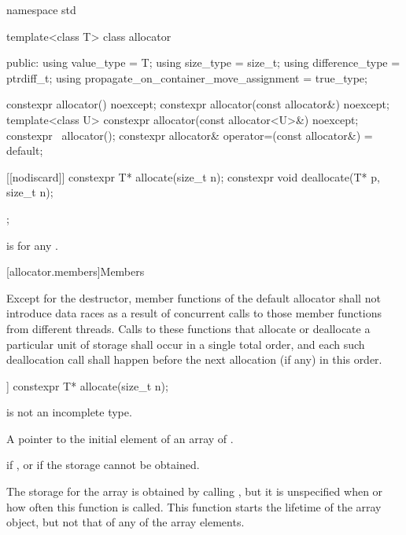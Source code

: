 %
%
%
%
%
%
%
\begin{codeblock}
namespace std {
  template<class T> class allocator {
   public:
    using value_type                             = T;
    using size_type                              = size_t;
    using difference_type                        = ptrdiff_t;
    using propagate_on_container_move_assignment = true_type;

    constexpr allocator() noexcept;
    constexpr allocator(const allocator&) noexcept;
    template<class U> constexpr allocator(const allocator<U>&) noexcept;
    constexpr ~allocator();
    constexpr allocator& operator=(const allocator&) = default;

    [[nodiscard]] constexpr T* allocate(size_t n);
    constexpr void deallocate(T* p, size_t n);
  };
}
\end{codeblock}

\pnum
{}
is  for any .

[allocator.members]{Members}

\pnum
Except for the destructor, member functions of the default allocator shall not introduce
data races as a result of concurrent calls to those member
functions from different threads. Calls to these functions that allocate or deallocate a
particular unit of storage shall occur in a single total order, and each such
deallocation call shall happen before the next allocation (if any) in this order.

%
\begin{itemdecl}
[[nodiscard]] constexpr T* allocate(size_t n);
\end{itemdecl}

\begin{itemdescr}
\pnum
\mandates
{} is not an incomplete type.

\pnum
\returns
A pointer to the initial element of an array of  .

\pnum
\throws
{} if
, or
 if the storage cannot be obtained.

\pnum
\remarks
The storage for the array
is obtained by calling ,
but it is unspecified when or how often this
function is called.
This function starts the lifetime of the array object,
but not that of any of the array elements.
\end{itemdescr}


